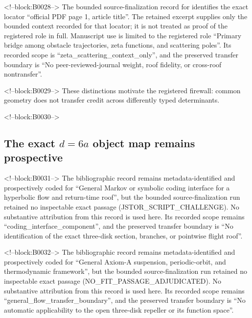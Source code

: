 \documentclass[11pt,a4paper]{article}
\begin{document}
<!--block:B0028-->
The bounded source-finalization record for \citep{P30-S10} identifies
the exact locator ``official PDF page 1, article title''.  The retained excerpt supplies only the
bounded context recorded for that locator; it is not treated as proof of the
registered role in full.  Manuscript use is limited to the registered role ``Primary bridge among obstacle trajectories, zeta functions, and scattering poles''.
Its recorded scope is ``zeta\_scattering\_context\_only'', and the preserved
transfer boundary is ``No peer-reviewed-journal weight, roof fidelity, or cross-roof nontransfer''.

<!--block:B0029-->
These distinctions motivate the registered firewall: common geometry does not transfer credit across differently typed determinants.

<!--block:B0030-->
\subsection{\texorpdfstring{The exact \(d=6a\) object map remains prospective}{The exact d=6a object map remains prospective}}

<!--block:B0031-->
The bibliographic record \citep{P30-S07} remains metadata-identified and
prospectively coded for ``General Markov or symbolic coding interface for a hyperbolic flow and return-time roof'', but the bounded source-finalization
run retained no inspectable exact passage (JSTOR\_SCRIPT\_CHALLENGE).  No substantive
attribution from this record is used here.  Its recorded scope remains
``coding\_interface\_component'', and the preserved transfer boundary is ``No identification of the exact three-disk section, branches, or pointwise flight roof''.

<!--block:B0032-->
The bibliographic record \citep{P30-S08} remains metadata-identified and
prospectively coded for ``General Axiom-A suspension, periodic-orbit, and thermodynamic framework'', but the bounded source-finalization
run retained no inspectable exact passage (NO\_FIT\_PASSAGE\_ADJUDICATED).  No substantive
attribution from this record is used here.  Its recorded scope remains
``general\_flow\_transfer\_boundary'', and the preserved transfer boundary is ``No automatic applicability to the open three-disk repeller or its function space''.
\end{document}
